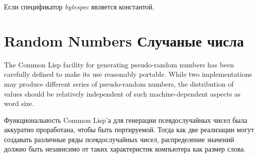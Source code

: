 \begin{defun}[Function]
\beforenoterule
\begin{implementation}
Если спецификатор \emph{bytespec} является константой, 
\end{implementation}
\afternoterule
\end{defun}

\section{Random Numbers Случаные числа}
\label{RANDOM}

The Common Lisp facility for generating pseudo-random numbers has
been carefully defined to make its use reasonably portable.
While two implementations may produce different series
of pseudo-random numbers, the distribution of values should
be relatively independent of such machine-dependent aspects
as word size.

Функциональность Common Lisp'а для генерации псевдослучайных чисел была
аккуратно проработана, чтобы быть портируемой. Тогда как две реализации могут
создавать различные ряды псевдослучайных чисел, распределение значений должно
быть независимо от таких характеристик компьютера как размер слова.

